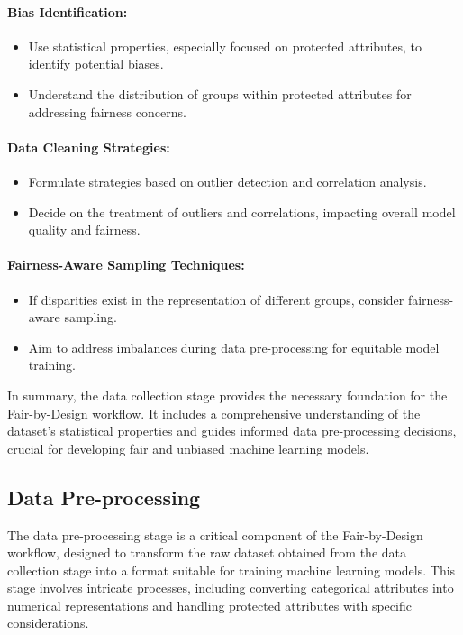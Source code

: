 \paragraph{Bias Identification:}
\begin{itemize}
    \item Use statistical properties, especially focused on protected attributes, to identify potential biases.
    \item Understand the distribution of groups within protected attributes for addressing fairness concerns.
\end{itemize}

\paragraph{Data Cleaning Strategies:}
\begin{itemize}
    \item Formulate strategies based on outlier detection and correlation analysis.
    \item Decide on the treatment of outliers and correlations, impacting overall model quality and fairness.
\end{itemize}

\paragraph{Fairness-Aware Sampling Techniques:}
\begin{itemize}
    \item If disparities exist in the representation of different groups, consider fairness-aware sampling.
    \item Aim to address imbalances during data pre-processing for equitable model training.
\end{itemize}

In summary, the data collection stage provides the necessary foundation for the Fair-by-Design workflow. It includes a comprehensive understanding of the dataset's statistical properties and guides informed data pre-processing decisions, crucial for developing fair and unbiased machine learning models.

\subsection{Data Pre-processing}
\label{subsection:data_pre_proc}

The data pre-processing stage is a critical component of the Fair-by-Design workflow, designed to transform the raw dataset obtained from the data collection stage into a format suitable for training machine learning models. This stage involves intricate processes, including converting categorical attributes into numerical representations and handling protected attributes with specific considerations.

